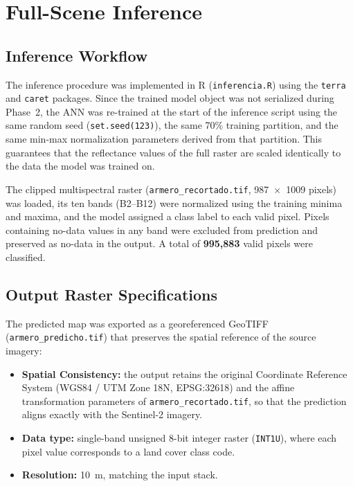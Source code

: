 \documentclass[12pt,a4paper]{article}
\begin{document}
\section{Full-Scene Inference}

\subsection{Inference Workflow}

The inference procedure was implemented in R (\texttt{inferencia.R}) using the \texttt{terra} and \texttt{caret} packages. Since the trained model object was not serialized during Phase~2, the ANN was re-trained at the start of the inference script using the same random seed (\texttt{set.seed(123)}), the same 70\% training partition, and the same min-max normalization parameters derived from that partition. This guarantees that the reflectance values of the full raster are scaled identically to the data the model was trained on.

The clipped multispectral raster (\texttt{armero\_recortado.tif}, 987~$\times$~1009 pixels) was loaded, its ten bands (B2--B12) were normalized using the training minima and maxima, and the model assigned a class label to each valid pixel. Pixels containing no-data values in any band were excluded from prediction and preserved as no-data in the output. A total of \textbf{995,883} valid pixels were classified.

\subsection{Output Raster Specifications}

The predicted map was exported as a georeferenced GeoTIFF (\texttt{armero\_predicho.tif}) that preserves the spatial reference of the source imagery:

\begin{itemize}
    \item \textbf{Spatial Consistency:} the output retains the original Coordinate Reference System (WGS84 / UTM Zone 18N, EPSG:32618) and the affine transformation parameters of \texttt{armero\_recortado.tif}, so that the prediction aligns exactly with the Sentinel-2 imagery.
    \item \textbf{Data type:} single-band unsigned 8-bit integer raster (\texttt{INT1U}), where each pixel value corresponds to a land cover class code.
    \item \textbf{Resolution:} 10~m, matching the input stack.
\end{itemize}
\end{document}
